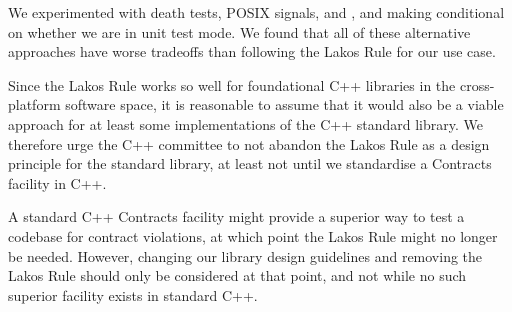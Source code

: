 We experimented with death tests, POSIX signals,  and , and making  conditional on whether we are in unit test mode. We found that all of these alternative approaches have worse tradeoffs than following the Lakos Rule for our use case.

Since the Lakos Rule works so well for foundational C++ libraries in the cross-platform software space, it is reasonable to assume that it would also be a viable approach for at least some implementations of the C++ standard library. We therefore urge the C++ committee to not abandon the Lakos Rule as a design principle for the standard library, at least not until we standardise a Contracts facility in C++.

A standard C++ Contracts facility might provide a superior way to test a codebase for contract violations, at which point the Lakos Rule might no longer be needed. However, changing our library design guidelines and removing the Lakos Rule should only be considered at that point, and not while no such superior facility exists in standard C++.



\renewcommand{\bibname}{References}



